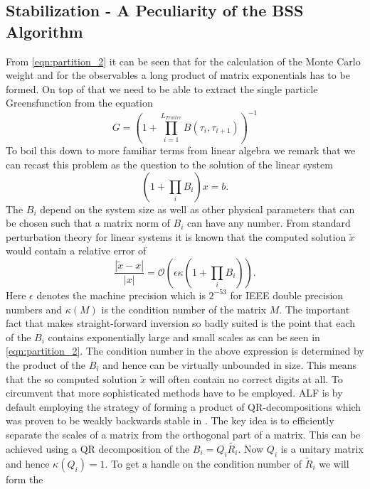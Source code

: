 
\subsection{Stabilization - A Peculiarity of the BSS Algorithm}
From \eqref{eqn:partition_2} it can be seen that for the calculation of the Monte Carlo weight
and for the observables a long product of matrix exponentials has to be formed.
On top of that we need to be able to extract the single particle Greensfunction from 
the equation 
\begin{equation}
G = \left( 1 + \prod_{i = 1}^{L_{Trotter}} B(\tau_i, \tau_{i+1})\right)^{-1}
\end{equation}
To boil this down to more familiar terms from linear algebra we remark that we can recast this problem as the question to the solution of the linear system
\begin{equation}
(1 + \prod_i B_i) x = b.
\end{equation}
The $B_i$ depend on the system size as well as other physical parameters that can be chosen such that a matrix norm of $B_i$ can have any number.
From standard perturbation theory for linear systems it is known that the computed solution $\tilde{x}$ would 
contain a relative error of
\begin{equation}
\frac{|\tilde{x} - x|}{|x|} = \mathcal{O}\left(\epsilon \kappa(1 + \prod_i B_i)\right).
\end{equation}
Here $\epsilon$ denotes the machine precision which is $2^{-53}$ for IEEE double precision numbers
and $\kappa(M)$ is the condition number of the matrix $M$.
The important fact that makes straight-forward inversion so badly suited is the point that
each of the $B_i$ contains exponentially large and small scales as can be seen in \eqref{eqn:partition_2}.
The condition number in the above expression is determined by the product of the $B_i$
and hence can be virtually unbounded in size. This means that the so computed solution $\tilde{x}$
will often contain no correct digits at all.
To circumvent that more sophisticated methods have to be employed. ALF is by default employing
the strategy of forming a product of QR-decompositions which was proven to be weakly backwards stable in \cite{Bai2011}.
The key idea is to efficiently separate the scales of a matrix from the orthogonal part of a matrix.
This can be achieved using a QR decomposition of the $B_i = Q_i \tilde{R_i}$. Now $Q_i$ is a unitary matrix and hence $\kappa(Q_i) = 1$.
To get a handle on the condition number of $\tilde{R}_i$ we will form the
